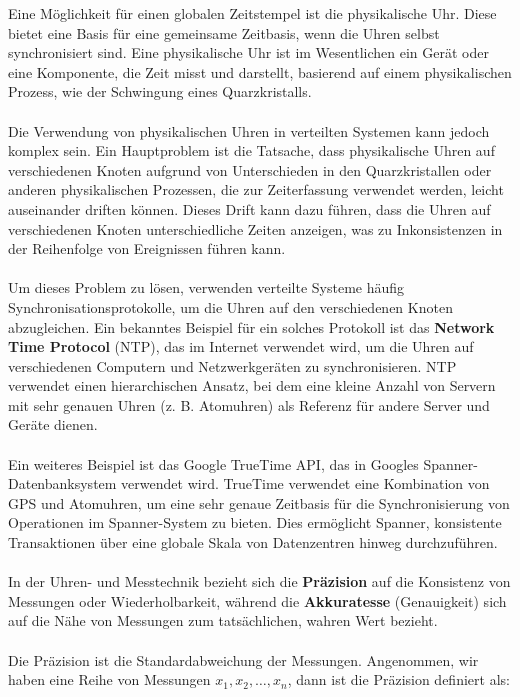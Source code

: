 \documentclass[../vs-script-first-v01.tex]{subfiles}
\begin{document}
Eine Möglichkeit für einen globalen Zeitstempel ist die physikalische Uhr. Diese bietet eine Basis für eine gemeinsame Zeitbasis, wenn die Uhren selbst synchronisiert sind. Eine physikalische Uhr ist im Wesentlichen ein Gerät oder eine Komponente, die Zeit misst und darstellt, basierend auf einem physikalischen Prozess, wie der Schwingung eines Quarzkristalls.
\\\\
Die Verwendung von physikalischen Uhren in verteilten Systemen kann jedoch komplex sein. Ein Hauptproblem ist die Tatsache, dass physikalische Uhren auf verschiedenen Knoten aufgrund von Unterschieden in den Quarzkristallen oder anderen physikalischen Prozessen, die zur Zeiterfassung verwendet werden, leicht auseinander driften können. Dieses Drift kann dazu führen, dass die Uhren auf verschiedenen Knoten unterschiedliche Zeiten anzeigen, was zu Inkonsistenzen in der Reihenfolge von Ereignissen führen kann.
\\\\
Um dieses Problem zu lösen, verwenden verteilte Systeme häufig Synchronisationsprotokolle, um die Uhren auf den verschiedenen Knoten abzugleichen. Ein bekanntes Beispiel für ein solches Protokoll ist das \textbf{Network Time Protocol} (NTP), das im Internet verwendet wird, um die Uhren auf verschiedenen Computern und Netzwerkgeräten zu synchronisieren. NTP verwendet einen hierarchischen Ansatz, bei dem eine kleine Anzahl von Servern mit sehr genauen Uhren (z. B. Atomuhren) als Referenz für andere Server und Geräte dienen.
\\\\
Ein weiteres Beispiel ist das Google TrueTime API, das in Googles Spanner-Datenbanksystem verwendet wird. TrueTime verwendet eine Kombination von GPS und Atomuhren, um eine sehr genaue Zeitbasis für die Synchronisierung von Operationen im Spanner-System zu bieten. Dies ermöglicht Spanner, konsistente Transaktionen über eine globale Skala von Datenzentren hinweg durchzuführen.
\\\\
In der Uhren- und Messtechnik bezieht sich die \textbf{Präzision} auf die Konsistenz von Messungen oder Wiederholbarkeit, während die \textbf{Akkuratesse} (Genauigkeit) sich auf die Nähe von Messungen zum tatsächlichen, wahren Wert bezieht.
\\\\
Die Präzision ist die Standardabweichung der Messungen. Angenommen, wir haben eine Reihe von Messungen $x_1, x_2, \ldots, x_n$, dann ist die Präzision definiert als:
\end{document}
